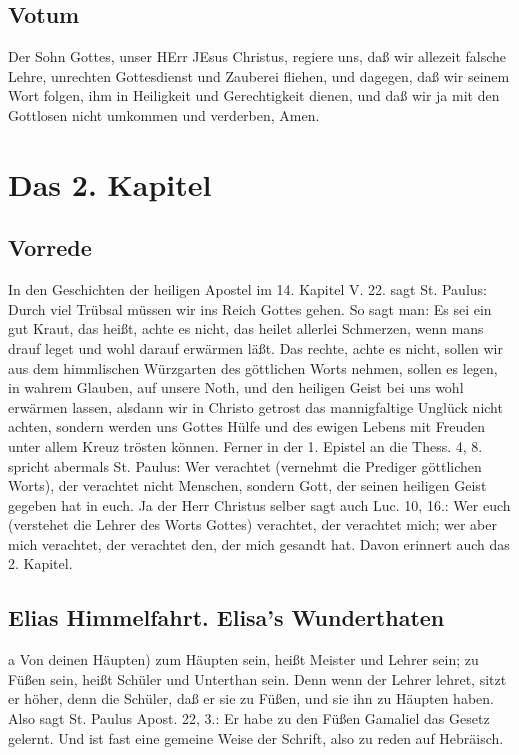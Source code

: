 \section{Votum}

Der Sohn Gottes, unser HErr JEsus Christus, regiere uns, daß wir allezeit falsche Lehre, unrechten Gottesdienst und Zauberei fliehen, und dagegen, daß wir seinem Wort folgen, ihm in Heiligkeit und Gerechtigkeit dienen, und daß wir ja mit den Gottlosen nicht umkommen und verderben, Amen.

\chapter{Das 2. Kapitel}

\section{Vorrede}

In den Geschichten der heiligen Apostel im 14. Kapitel V. 22. sagt St. Paulus: Durch viel Trübsal müssen wir ins Reich Gottes gehen. So sagt man: Es sei ein gut Kraut, das heißt, achte es nicht, das heilet allerlei Schmerzen, wenn mans drauf leget und wohl darauf erwärmen läßt. Das rechte, achte es nicht, sollen wir aus dem himmlischen Würzgarten des göttlichen Worts nehmen, sollen es legen, in wahrem Glauben, auf unsere Noth, und den heiligen Geist bei uns wohl erwärmen lassen, alsdann wir in Christo getrost das mannigfaltige Unglück nicht achten, sondern werden uns Gottes Hülfe und des ewigen Lebens mit Freuden unter allem Kreuz trösten können. Ferner in der 1. Epistel an die Thess. 4, 8. spricht abermals St. Paulus: Wer verachtet (vernehmt die Prediger göttlichen Worts), der verachtet nicht Menschen, sondern Gott, der seinen heiligen Geist gegeben hat in euch. Ja der Herr Christus selber sagt auch Luc. 10, 16.: Wer euch (verstehet die Lehrer des Worts Gottes) verachtet, der verachtet mich; wer aber mich verachtet, der verachtet den, der mich gesandt hat. Davon erinnert auch das 2. Kapitel.

\section{Elias Himmelfahrt. Elisa's Wunderthaten}

a Von deinen Häupten) zum Häupten sein, heißt Meister und Lehrer sein; zu Füßen sein, heißt Schüler und Unterthan sein. Denn wenn der Lehrer lehret, sitzt er höher, denn die Schüler, daß er sie zu Füßen, und sie ihn zu Häupten haben. Also sagt St. Paulus Apost. 22, 3.: Er habe zu den Füßen Gamaliel das Gesetz gelernt. Und ist fast eine gemeine Weise der Schrift, also zu reden auf Hebräisch.

